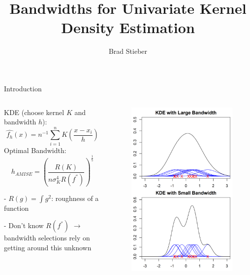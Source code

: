\documentclass[ignorenonframetext,]{beamer}
\title{Bandwidths for Univariate Kernel Density Estimation}
\author{Brad Stieber}
\date{}
\begin{document}
\frame{\titlepage}

\begin{frame}{Introduction}

\begin{columns}
\begin{column}{0.5\textwidth}
    KDE (choose kernel $K$ and bandwidth $h$): 
    $$ \widehat{f_h}(x) = n^{-1} \sum_{i = 1}^{n}K\left(\frac{x - x_i}{h}\right) $$
    Optimal Bandwidth:
    $$ h_{AMISE} = \left(\frac{R(K)}{n\sigma_K^4R(f^{''})}\right)^{\frac{1}{5}} $$
    
    - $R(g) = \int g^2$: roughness of a function
    
    - Don't know $R(f^{''})$ $\rightarrow$ bandwidth selections rely on getting around this unknown
    
\end{column}
\begin{column}{0.5\textwidth}  %
    \begin{figure}[t]
     \includegraphics[width = 7in]{KDEDemo.png}
     \centering
     \end{figure}
\end{column}
\end{columns}

\end{frame}
\end{document}
